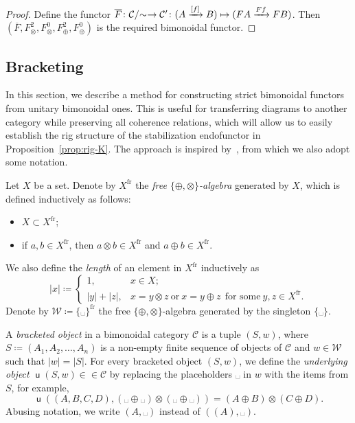 \documentclass[10pt]{simplearticle}
\newcommand{\mathsb}[1]{\boldsymbol{\mathsf{#1}}}
\newcommand{\mmph}{\text{{␣}}}
\newcommand{\fr}{\textrm{fr}}
\renewcommand{\u}{\operatorname{\mathsb u}}
\newcommand{\modrel}[1]{/\hspace{-0.6ex}#1\hspace{0.1ex}}
\begin{document}
\begin{proof}
Define the functor
$\overline{F}\colon\mathcal{C}\modrel{\sim}\to\mathcal{C}'\colon(A\xrightarrow{[f]}B)\mapsto(FA\xrightarrow{Ff}FB)$.
Then
$(\overline{F},F^{2}_{\otimes},F^{0}_{\otimes},F^{2}_{\oplus},F^{0}_{\oplus})$
is the required bimonoidal functor.
\end{proof}

\subsection{Bracketing}

In this section, we describe a method for constructing strict bimonoidal
functors from unitary bimonoidal ones. This is useful for transferring
diagrams to another category while preserving all coherence relations,
which
will allow us to easily establish the rig structure
of the stabilization endofunctor in Proposition~\ref{prop:rig-K}.
The approach is inspired by~\cite{becerra2024strictification}, from
which we also adopt some notation.
\begin{defn}
Let $X$ be a set. Denote by $X^{\fr}$ the \emph{free $\{\oplus,\otimes\}$-algebra}
generated by $X$, which is defined inductively as follows:
\begin{itemize}
\item $X\subset X^{\fr}$;
\item if $a,b\in X^{\fr}$, then $a\otimes b\in X^{\fr}$ and $a\oplus b\in X^{\fr}$.
\end{itemize}
We also define the \emph{length} of an element in $X^{\fr}$ inductively
as
\[
|x|\coloneqq\begin{cases}
1, & x\in X;\\
|y|+|z|, & x=y\otimes z~\textrm{or}~x=y\oplus z~~\textrm{for some}~y,z\in X^{\fr}.
\end{cases}
\]
Denote by $\mathscr{W}\coloneqq\{\mmph\}^{\fr}$ the free $\{\oplus,\otimes\}$-algebra
generated by the singleton $\{\mmph\}$.
\end{defn}

\begin{defn}
A \emph{bracketed object} in a bimonoidal category $\mathcal{C}$
is a tuple $(S,w)$, where $S\coloneqq(A_{1},A_{2},\dots,A_{n})$
is a non-empty finite sequence of objects of $\mathcal{C}$ and $w\in\mathscr{W}$
such that $|w|=|S|$. For every bracketed object $(S,w)$, we define
the \emph{underlying object} $\u(S,w)\in\in\mathcal{C}$ by replacing
the placeholders $\mmph$ in $w$ with the items from $S$, for example,
\[
\u((A,B,C,D),(\mmph\oplus\mmph)\otimes(\mmph\oplus\mmph))=(A\oplus B)\otimes(C\oplus D).
\]
Abusing notation, we write $(A,\mmph)$ instead of $((A),\mmph)$.
\end{defn}
\end{document}
